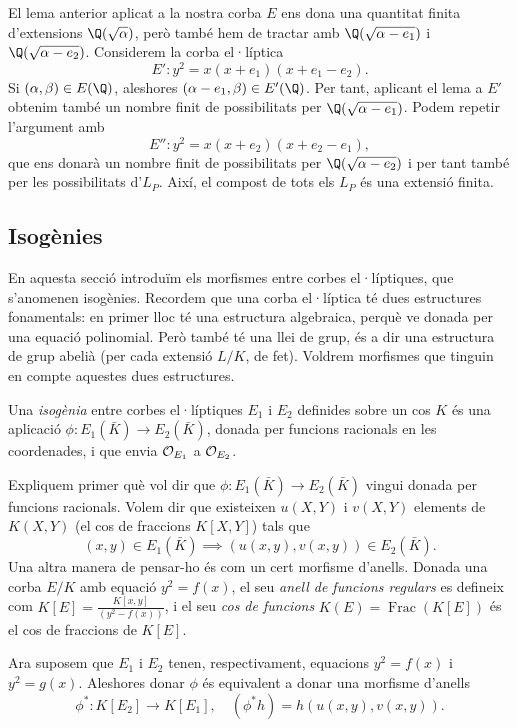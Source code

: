 El lema anterior aplicat a la nostra corba $E$ ens dona una quantitat finita d'extensions $\Q(\sqrt{\alpha})$, però també hem de tractar amb $\Q(\sqrt{\alpha-e_1})$ i $\Q(\sqrt{\alpha-e_2})$. Considerem la corba el·líptica
\[
E'\colon y^2=x(x+e_1)(x+e_1-e_2).
\]
Si $(\alpha,\beta)\in E(\Q)$, aleshores $(\alpha -e_1,\beta)\in E'(\Q)$. Per tant, aplicant el lema a $E'$ obtenim també un nombre finit de possibilitats per $\Q(\sqrt{\alpha-e_1})$. Podem repetir l'argument amb
\[
E''\colon y^2=x(x+e_2)(x+e_2-e_1),
\]
que ens donarà un nombre finit de possibilitats per $\Q(\sqrt{\alpha-e_2})$ i per tant també per les possibilitats d'$L_P$. Així, el compost de tots els $L_P$ és una extensió finita.

\subsection{Isogènies}
En aquesta secció introduïm els morfismes entre corbes el·líptiques, que s'anomenen isogènies. Recordem que una corba el·líptica té dues estructures fonamentals: en primer lloc té una estructura algebraica, perquè ve donada per una equació polinomial. Però també té una llei de grup, és a dir una estructura de grup abelià (per cada extensió $L/K$, de fet). Voldrem morfismes que tinguin en compte aquestes dues estructures.
\begin{definition}
Una \emph{isogènia} entre corbes el·líptiques $E_1$ i $E_2$ definides sobre un cos $K$ és una aplicació $\phi\colon E_1(\bar K)\to E_2(\bar K)$, donada per funcions racionals en les coordenades, i que envia $\mathcal{O}_{E_1}$ a $\mathcal{O}_{E_2}$.
\end{definition}
Expliquem primer què vol dir que $\phi\colon E_1(\bar K)\to E_2(\bar K)$ vingui donada per funcions racionals. Volem dir que existeixen $u(X,Y)$ i $v(X,Y)$ elements de $K(X,Y)$ (el cos de fraccions $K[X,Y]$) tals que
\[
(x,y)\in E_1(\bar K) \implies (u(x,y),v(x,y))\in E_2(\bar K).
\]
Una altra manera de pensar-ho és com un cert morfisme d'anells. Donada una corba $E/K$ amb equació $y^2=f(x)$, el seu \emph{anell de funcions regulars} es defineix com $K[E] =\frac{K[x,y]}{(y^2-f(x))}$,
i el seu \emph{cos de funcions} $K(E)=\operatorname{Frac}(K[E])$ és el cos de fraccions de $K[E]$.

Ara suposem que $E_1$ i $E_2$ tenen, respectivament, equacions $y^2=f(x)$ i $y^2=g(x)$. Aleshores donar $\phi$ és equivalent a donar una morfisme d'anells
\[
\phi^* \colon K[E_2] \to K[E_1],\quad (\phi^* h) = h(u(x,y),v(x,y)).
\]

